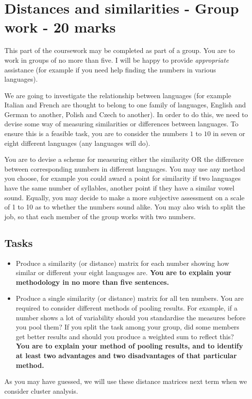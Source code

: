 \documentclass[11pt]{article}
\begin{document}
\section{Distances and similarities - Group work - 20 marks}

This part of the coursework may be completed as part of a group.   You are to work in groups of no more than five.   I will be happy to provide \emph{appropriate} assistance (for example if you need help finding the numbers in various languages).

We are going to investigate the relationship between languages (for example Italian and French are thought to belong to one family of languages, English and German to another, Polish and Czech to another).   In order to do this, we need to devise some way of measuring similarities or differences between languages.   To ensure this is a feasible task, you are to consider the numbers $1$ to $10$ in seven or eight different languages (any languages will do).

You are to devise a scheme for measuring either the similarity OR the difference between corresponding numbers in different languages.   You may use any method you choose, for example you could award a point for similarity if two languages have the same number of syllables, another point if they have a similar vowel sound.   Equally, you may decide to make a more subjective assessment on a scale of 1 to 10 as to whether the numbers sound alike.   You may also wish to split the job, so that each member of the group works with two numbers.

\subsection{Tasks}

\begin{itemize}
\item Produce a similarity (or distance) matrix for each number showing how similar or different your eight languages are.  \textbf{You are to explain your methodology in no more than five sentences.}

\item Produce a single similarity (or distance) matrix for all ten numbers.   You are required to consider different methods of pooling results.   For example, if a number shows a lot of variability should you standardise the measures before you pool them?   If you split the task among your group, did some members get better results and should you produce a weighted sum to reflect this?   \textbf{You are to explain your method of pooling results, and to identify at least two advantages and two disadvantages of that particular method.} 
\end{itemize}

As you may have guessed, we will use these distance matrices next term when we consider cluster analysis.
\end{document}

